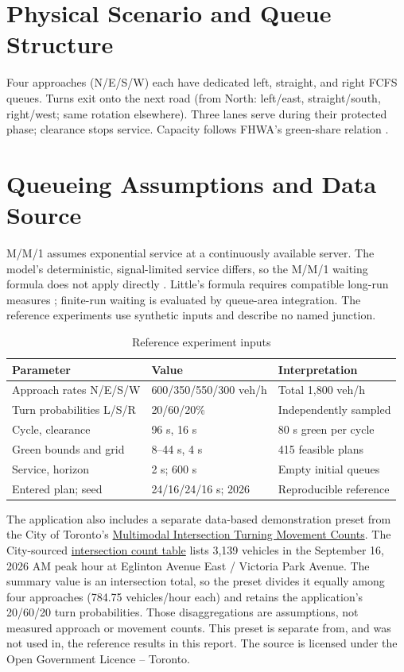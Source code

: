 \documentclass[12pt,a4paper]{report}
\begin{document}
\section{Physical Scenario and Queue Structure}
Four approaches (N/E/S/W) each have dedicated left, straight, and right FCFS queues. Turns exit onto the next road (from North: left/east, straight/south, right/west; same rotation elsewhere). Three lanes serve during their protected phase; clearance stops service. Capacity follows FHWA's green-share relation \cite{fhwa}.

\section{Queueing Assumptions and Data Source}
M/M/1 assumes exponential service at a continuously available server. The model's deterministic, signal-limited service differs, so the M/M/1 waiting formula does not apply directly \cite{saaty,taha}. Little's formula requires compatible long-run measures \cite{little}; finite-run waiting is evaluated by queue-area integration. The reference experiments use synthetic inputs and describe no named junction.

\begin{table}[H]\centering\caption{Reference experiment inputs}\label{tab:inputs}
\begin{tabular}{lll}\toprule
Parameter & Value & Interpretation\\\midrule
Approach rates N/E/S/W & 600/350/550/300 veh/h & Total 1,800 veh/h\\
Turn probabilities L/S/R & 20/60/20\% & Independently sampled\\
Cycle, clearance & 96 s, 16 s & 80 s green per cycle\\
Green bounds and grid & 8--44 s, 4 s & 415 feasible plans\\
Service, horizon & 2 s; 600 s & Empty initial queues\\
Entered plan; seed & 24/16/24/16 s; 2026 & Reproducible reference\\\bottomrule
\end{tabular}\end{table}

The application also includes a separate data-based demonstration preset from the City of Toronto's \href{https://open.toronto.ca/dataset/traffic-volumes-at-intersections-for-all-modes/}{Multimodal Intersection Turning Movement Counts}. The City-sourced \href{https://www.toraffic.ca/data/intersection-counts}{intersection count table} lists 3,139 vehicles in the September 16, 2026 AM peak hour at Eglinton Avenue East / Victoria Park Avenue. The summary value is an intersection total, so the preset divides it equally among four approaches (784.75 vehicles/hour each) and retains the application's 20/60/20 turn probabilities. Those disaggregations are assumptions, not measured approach or movement counts. This preset is separate from, and was not used in, the reference results in this report. The source is licensed under the Open Government Licence -- Toronto.
\end{document}
